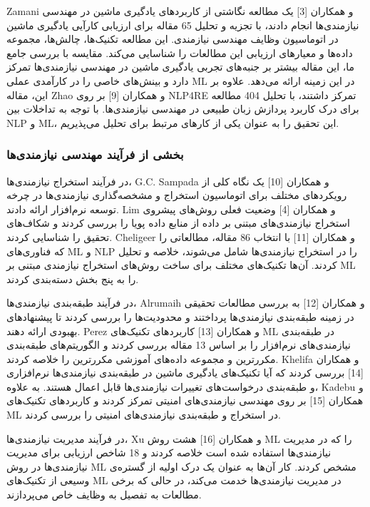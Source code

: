 \documentclass[a4paper,10pt]{article}
\begin{document}
                Zamani و همکاران [3] یک مطالعه نگاشتی از کاربردهای یادگیری ماشین در مهندسی نیازمندی‌ها انجام دادند، با تجزیه و تحلیل 65 مقاله برای ارزیابی کارآیی یادگیری ماشین در اتوماسیون وظایف مهندسی نیازمندی. این مطالعه تکنیک‌ها، چالش‌ها، مجموعه داده‌ها و معیارهای ارزیابی این مطالعات را شناسایی می‌کند. مقایسه با بررسی جامع ما، این مقاله بیشتر بر جنبه‌های تجربی یادگیری ماشین در مهندسی نیازمندی‌ها تمرکز دارد و بینش‌های خاصی را در کارآمدی عملی ML در این زمینه ارائه می‌دهد. علاوه بر این، مقاله Zhao و همکاران [9] بر روی NLP4RE تمرکز داشتند، با تحلیل 404 مطالعه برای درک کاربرد پردازش زبان طبیعی در مهندسی نیازمندی‌ها. با توجه به تداخلات بین NLP و ML، این تحقیق را به عنوان یکی از کارهای مرتبط برای تحلیل می‌پذیریم.
            
            
            \subsubsection{بخشی از فرآیند مهندسی نیازمندی‌ها}

                در فرآیند استخراج نیازمندی‌ها، G.C. Sampada و همکاران [10] یک نگاه کلی از رویکردهای مختلف برای اتوماسیون استخراج و مشخصه‌گذاری نیازمندی‌ها در چرخه توسعه نرم‌افزار ارائه دادند. Lim و همکاران [4] وضعیت فعلی روش‌های پیشروی استخراج نیازمندی‌های مبتنی بر داده از منابع داده پویا را بررسی کردند و شکاف‌های تحقیق را شناسایی کردند. Cheligeer و همکاران [11] با انتخاب 86 مقاله، مطالعاتی را که فناوری‌های ML و NLP را در استخراج نیازمندی‌ها شامل می‌شوند، خلاصه و تحلیل کردند. آن‌ها تکنیک‌های مختلف برای ساخت روش‌های استخراج نیازمندی مبتنی بر ML را به پنج بخش دسته‌بندی کردند.

                در فرآیند طبقه‌بندی نیازمندی‌ها، Alrumaih و همکاران [12] به بررسی مطالعات تحقیقی در زمینه طبقه‌بندی نیازمندی‌ها پرداختند و محدودیت‌ها را بررسی کردند تا پیشنهادهای بهبودی ارائه دهند. Perez و همکاران [13] کاربردهای تکنیک‌های ML در طبقه‌بندی نیازمندی‌های نرم‌افزار را بر اساس 13 مقاله بررسی کردند و الگوریتم‌های طبقه‌بندی مکررترین و مجموعه داده‌های آموزشی مکررترین را خلاصه کردند. Khelifa و همکاران [14] بررسی کردند که آیا تکنیک‌های یادگیری ماشین در طبقه‌بندی نیازمندی‌ها نرم‌افزاری و طبقه‌بندی درخواست‌های تغییرات نیازمندی‌ها قابل اعمال هستند. به علاوه، Kadebu و همکاران [15] بر روی مهندسی نیازمندی‌های امنیتی تمرکز کردند و کاربردهای تکنیک‌های ML در استخراج و طبقه‌بندی نیازمندی‌های امنیتی را بررسی کردند.

                در فرآیند مدیریت نیازمندی‌ها، Xu و همکاران [16] هشت روش ML را که در مدیریت نیازمندی‌ها استفاده شده است خلاصه کردند و 18 شاخص ارزیابی برای مدیریت نیازمندی‌ها در روش ML مشخص کردند. کار آن‌ها به عنوان یک درک اولیه از گستره‌ی وسیعی از تکنیک‌های ML در مدیریت نیازمندی‌ها خدمت می‌کند، در حالی که برخی مطالعات به تفصیل به وظایف خاص می‌پردازند.
\end{document}
